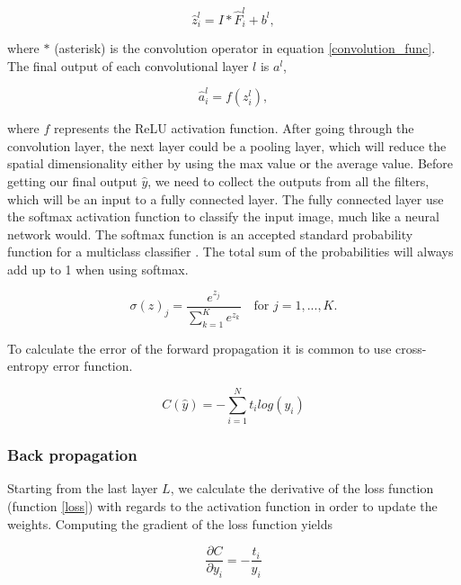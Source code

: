 \documentclass[english, a4paper]{report}
\begin{document}
\begin{equation}
    \hat{z}_i^l = I * \hat{F}_i^l + b^l, 
\end{equation}

where $*$ (asterisk) is the convolution operator in equation \ref{convolution_func}. The final output of each convolutional layer $l$ is $a^l$,

\begin{equation}
    \hat{a}_i^l = f(z_i^l), 
\end{equation}

where $f$ represents the ReLU activation function. After going through the convolution layer, the next layer could be a pooling layer, which will reduce the spatial dimensionality either by using the max value or the average value.
Before getting our final output $\hat{y}$, we need to collect the outputs from all the filters, which will be an input to a fully connected layer. 
The fully connected layer use the softmax activation function to classify the input image, much like a neural network would. The softmax function is an accepted standard probability function for a multiclass classifier \cite{NotesBackpropagation16}. The total sum of the probabilities will always add up to 1 when using softmax. 

\begin{equation} %
  \sigma(z)_j = \frac{e^{z_j}}{\sum_{k=1}^{K} e^{z_k}} \quad \text{for } j = 1, ..., K.
  \label{softmax}
\end{equation}

To calculate the error of the forward propagation it is common to use cross-entropy error function.

\begin{equation} %
  C(\hat{y}) = - \sum_{i=1}^N t_i log(y_i)
  \label{loss}
\end{equation}


\subsubsection{Back propagation}
Starting from the last layer $L$, we calculate the derivative of the loss function (function \ref{loss}) with regards to the activation function in order to update the weights. Computing the gradient of the loss function yields

\begin{equation}
  \frac{\partial C}{\partial y_i} = - \frac{t_i}{y_i}
\end{equation}
\end{document}
